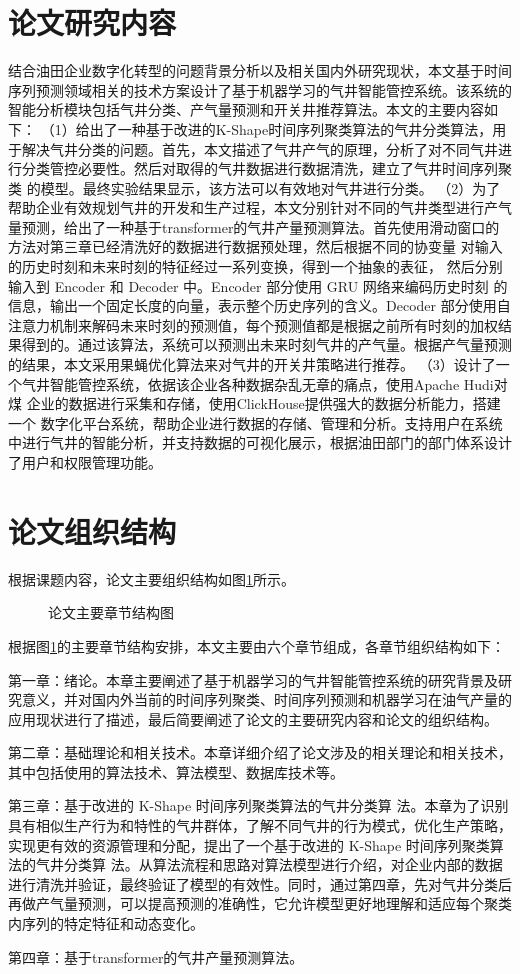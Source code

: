 \section{论文研究内容}
结合油田企业数字化转型的问题背景分析以及相关国内外研究现状，本文基于时间序列预测领域相关的技术方案设计了基于机器学习的气井智能管控系统。该系统的智能分析模块包括气井分类、产气量预测和开关井推荐算法。本文的主要内容如下：
（1）给出了一种基于改进的K-Shape时间序列聚类算法的气井分类算法，用于解决气井分类的问题。首先，本文描述了气井产气的原理，分析了对不同气井进行分类管控必要性。然后对取得的气井数据进行数据清洗，建立了气井时间序列聚类
的模型。最终实验结果显示，该方法可以有效地对气井进行分类。
（2）为了帮助企业有效规划气井的开发和生产过程，本文分别针对不同的气井类型进行产气量预测，给出了一种基于transformer的气井产量预测算法。首先使用滑动窗口的方法对第三章已经清洗好的数据进行数据预处理，然后根据不同的协变量
对输入的历史时刻和未来时刻的特征经过一系列变换，得到一个抽象的表征，
然后分别输入到 Encoder 和 Decoder 中。Encoder 部分使用 GRU 网络来编码历史时刻
的信息，输出一个固定长度的向量，表示整个历史序列的含义。Decoder 部分使用自
注意力机制来解码未来时刻的预测值，每个预测值都是根据之前所有时刻的加权结
果得到的。通过该算法，系统可以预测出未来时刻气井的产气量。根据产气量预测的结果，本文采用果蝇优化算法来对气井的开关井策略进行推荐。
（3）设计了一个气井智能管控系统，依据该企业各种数据杂乱无章的痛点，使用Apache Hudi对煤
企业的数据进行采集和存储，使用ClickHouse提供强大的数据分析能力，搭建一个
数字化平台系统，帮助企业进行数据的存储、管理和分析。支持用户在系统中进行气井的智能分析，并支持数据的可视化展示，根据油田部门的部门体系设计了用户和权限管理功能。
\section{论文组织结构}
根据课题内容，论文主要组织结构如图\ref{fig:paperStructure}所示。
\begin{figure}[H]
    \centering
    \caption{论文主要章节结构图}
    \label{fig:paperStructure}
\end{figure}
根据图\ref{fig:paperStructure}的主要章节结构安排，本文主要由六个章节组成，各章节组织结构如下：

第一章：绪论。本章主要阐述了基于机器学习的气井智能管控系统的研究背景及研究意义，并对国内外当前的时间序列聚类、时间序列预测和机器学习在油气产量的应用现状进行了描述，最后简要阐述了论文的主要研究内容和论文的组织结构。

第二章：基础理论和相关技术。本章详细介绍了论文涉及的相关理论和相关技术，其中包括使用的算法技术、算法模型、数据库技术等。

第三章：基于改进的 K-Shape 时间序列聚类算法的气井分类算
法。本章为了识别具有相似生产行为和特性的气井群体，了解不同气井的行为模式，优化生产策略，实现更有效的资源管理和分配，提出了一个基于改进的 K-Shape 时间序列聚类算法的气井分类算
法。从算法流程和思路对算法模型进行介绍，对企业内部的数据进行清洗并验证，最终验证了模型的有效性。同时，通过第四章，先对气井分类后再做产气量预测，可以提高预测的准确性，它允许模型更好地理解和适应每个聚类内序列的特定特征和动态变化。

第四章：基于transformer的气井产量预测算法。